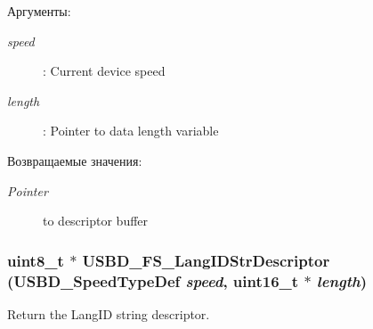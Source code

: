 \begin{Desc}
\item[Аргументы:]
\begin{description}
\item[{\em speed}]: Current device speed \item[{\em length}]: Pointer to data length variable \end{description}
\end{Desc}
\begin{Desc}
\item[Возвращаемые значения:]
\begin{description}
\item[{\em Pointer}]to descriptor buffer \end{description}
\end{Desc}
\hypertarget{group___u_s_b_d___d_e_s_c___private___functions_gc02628ceb6a6a071e192dcb85063c0cc}{
\subsubsection[{USBD\_\-FS\_\-LangIDStrDescriptor}]{\setlength{\rightskip}{0pt plus 5cm}uint8\_\-t $\ast$ USBD\_\-FS\_\-LangIDStrDescriptor (USBD\_\-SpeedTypeDef {\em speed}, \/  uint16\_\-t $\ast$ {\em length})}}
\label{group___u_s_b_d___d_e_s_c___private___functions_gc02628ceb6a6a071e192dcb85063c0cc}


Return the LangID string descriptor. 

